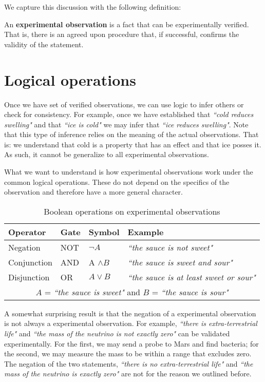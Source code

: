 \documentclass[11pt,letterpaper,fleqn]{memoir} %
\begin{document}
We capture this discussion with the following definition:
\begin{defn}
An \textbf{experimental observation} is a fact that can be experimentally verified. That is, there is an agreed upon procedure that, if successful, confirms the validity of the statement.
\end{defn}

\section{Logical operations}

Once we have set of verified observations, we can use logic to infer others or check for consistency. For example, once we have established that \emph{``cold reduces swelling"} and that \emph{``ice is cold"} we may infer that \emph{``ice 
reduces swelling"}. Note that this type of inference relies on the meaning of the actual observations. That is: we understand that cold is a property that has an effect and that ice posses it. As such, it cannot be generalize to all experimental observations.

What we want to understand is how experimental observations work under the common logical operations. These do not depend on the specifics of the observation and therefore have a more general character.
\begin{table}[h]
	\centering
	\begin{tabular}{p{} p{} p{} p{}}
		Operator & Gate & Symbol & Example \\ 
		\hline 
		Negation & NOT & $\neg A$ &  \emph{``the sauce is not sweet"} \\ 
		Conjunction & AND & A $\wedge B$ & \emph{``the sauce is sweet and sour"} \\ 
		Disjunction & OR & $A \vee B$ & \emph{``the sauce is at least sweet or sour"}\\
		\multicolumn{4}{c}{  $A$ = \emph{``the sauce is sweet"} and $B$ = \emph{``the sauce is sour"}}
	\end{tabular} 
	\caption{Boolean operations on experimental observations}
\end{table}

A somewhat surprising result is that the negation of a experimental observation is not always a experimental observation. For example, \emph{``there is extra-terrestrial life"} and \emph{``the mass of the neutrino is not exactly zero"} can be validated experimentally. For the first, we may send a probe to Mars and find bacteria; for the second, we may measure the mass to be within a range that excludes zero. The negation of the two statements,  \emph{``there is no extra-terrestrial life"} and \emph{``the mass of the neutrino is exactly zero"} are not for the reason we outlined before.
\end{document}
